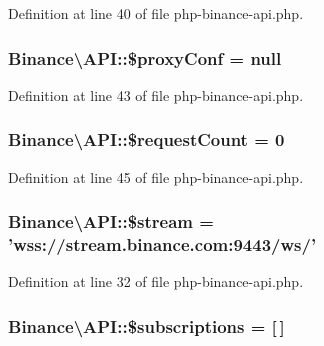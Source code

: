 Definition at line 40 of file php-\/binance-\/api.\-php.

\hypertarget{classBinance_1_1API_a1415587257942c2b5af22c642ff58005}{
\subsubsection[{\$proxy\-Conf}]{\setlength{\rightskip}{0pt plus 5cm}Binance\textbackslash{}\-A\-P\-I\-::\$proxy\-Conf = null\hspace{0.3cm}{\ttfamily [protected]}}}\label{classBinance_1_1API_a1415587257942c2b5af22c642ff58005}


Definition at line 43 of file php-\/binance-\/api.\-php.

\hypertarget{classBinance_1_1API_a69a4bfc5a6773dff1d01166dfbb402a2}{
\subsubsection[{\$request\-Count}]{\setlength{\rightskip}{0pt plus 5cm}Binance\textbackslash{}\-A\-P\-I\-::\$request\-Count = 0\hspace{0.3cm}{\ttfamily [protected]}}}\label{classBinance_1_1API_a69a4bfc5a6773dff1d01166dfbb402a2}


Definition at line 45 of file php-\/binance-\/api.\-php.

\hypertarget{classBinance_1_1API_a0ce2df2282110071b78061c3043200af}{
\subsubsection[{\$stream}]{\setlength{\rightskip}{0pt plus 5cm}Binance\textbackslash{}\-A\-P\-I\-::\$stream = 'wss\-://stream.\-binance.\-com\-:9443/ws/'\hspace{0.3cm}{\ttfamily [protected]}}}\label{classBinance_1_1API_a0ce2df2282110071b78061c3043200af}


Definition at line 32 of file php-\/binance-\/api.\-php.

\hypertarget{classBinance_1_1API_a858ac2cec1de7719779b6c517adcb0bf}{
\subsubsection[{\$subscriptions}]{\setlength{\rightskip}{0pt plus 5cm}Binance\textbackslash{}\-A\-P\-I\-::\$subscriptions = \mbox{[}$\,$\mbox{]}}}\label{classBinance_1_1API_a858ac2cec1de7719779b6c517adcb0bf}


